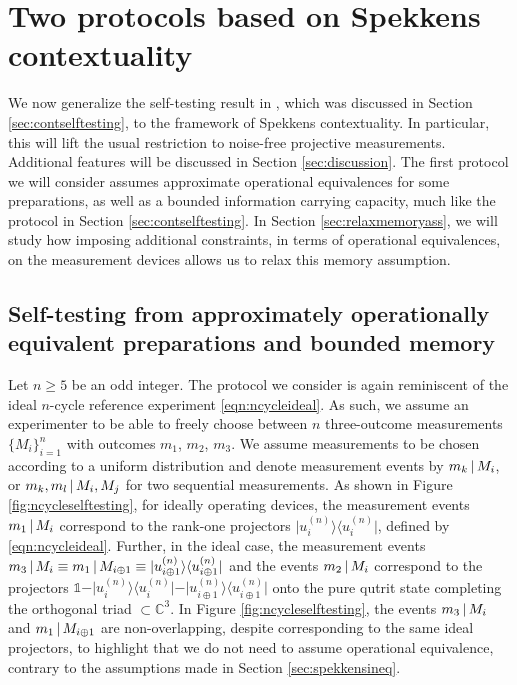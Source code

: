 \chapter{Two protocols based on Spekkens contextuality}
\label{sec:protocols}
We now generalize the self-testing result in \cite{Bharti2019}, which was discussed in Section \ref{sec:contselftesting}, to the framework of Spekkens contextuality. In particular, this will lift the usual restriction to noise-free projective measurements. Additional features will be discussed in Section \ref{sec:discussion}. The first protocol we will consider assumes approximate operational equivalences for some preparations, as well as a bounded information carrying capacity, much like the protocol in Section \ref{sec:contselftesting}. In Section \ref{sec:relaxmemoryass}, we will study how imposing additional constraints, in terms of operational equivalences, on the measurement devices allows us to relax this memory assumption.
\section{Self-testing from approximately operationally equivalent preparations and bounded memory}
Let $n\geq 5$ be an odd integer. The protocol we consider is again reminiscent of the ideal $n$-cycle reference experiment \ref{eqn:ncycleideal}. As such, we assume an experimenter to be able to freely choose between $n$ three-outcome measurements $\{M_i\}_{i=1}^n$ with outcomes $m_1$, $m_2$, $m_3$. We assume measurements to be chosen according to a uniform distribution and denote measurement events by  $m_k\thinspace\vert\thinspace M_i$, or $m_k,m_l\thinspace\vert\thinspace M_i,M_j$ for two sequential measurements. As shown in Figure \ref{fig:ncycleselftesting}, for ideally operating devices, the measurement events $m_1 \thinspace\vert\thinspace M_i$ correspond to the rank-one projectors $\vert u_i^{(n)}\rangle\langle u_i^{(n)}\vert$, defined by \ref{eqn:ncycleideal}. Further, in the ideal case, the measurement events $m_3\thinspace\vert\thinspace M_i\equiv m_1\thinspace\vert\thinspace M_{i\oplus 1}\equiv\vert u_{i\oplus 1}^{(n)}\rangle\langle u_{i\oplus 1}^{(n)}\vert$ and the events $m_2\thinspace\vert\thinspace M_i$ correspond to the projectors $\mathbb{1}-\vert u_i^{(n)}\rangle\langle u_i^{(n)}\vert-\vert u_{i\oplus 1}^{(n)}\rangle\langle u_{i\oplus 1}^{(n)}\vert$ onto the pure qutrit state completing the orthogonal triad $\subset \mathbb{C}^3$. In Figure \ref{fig:ncycleselftesting}, the events $m_3\thinspace \vert\thinspace M_i$ and $m_1\thinspace\vert\thinspace M_{i\oplus 1}$ are non-overlapping, despite corresponding to the same ideal projectors, to highlight that we do not need to assume operational equivalence, contrary to the assumptions made in Section \ref{sec:spekkensineq}.


